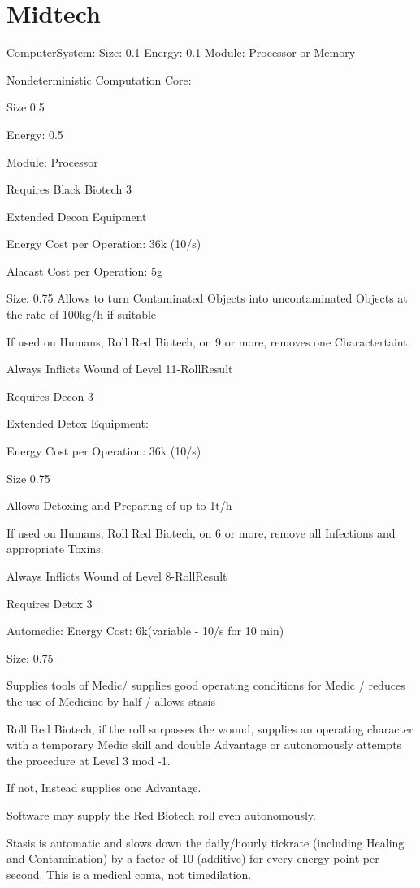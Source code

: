 \section{Midtech}\label{sec:midtech}
ComputerSystem:
Size: 0.1
Energy: 0.1
Module: Processor or Memory\par
\par
Nondeterministic Computation Core:\par
Size 0.5\par
Energy: 0.5\par
Module: Processor\par
Requires Black Biotech 3\par
\par
Extended Decon Equipment\par
Energy Cost per Operation: 36k (10/s)\par
Alacast Cost per Operation: 5g\par
Size: 0.75
Allows to turn Contaminated Objects into uncontaminated Objects at the rate of 100kg/h if suitable\par
If used on Humans, Roll Red Biotech, on 9 or more, removes one Charactertaint.\par
Always Inflicts Wound of Level 11-RollResult\par
Requires Decon 3\par
\par
Extended Detox Equipment:\par
Energy Cost per Operation: 36k (10/s)\par
Size 0.75\par
Allows Detoxing and Preparing of up to 1t/h\par
If used on Humans, Roll Red Biotech, on 6 or more, remove all Infections and appropriate Toxins.\par
Always Inflicts Wound of Level 8-RollResult\par
Requires Detox 3\par
Automedic:
Energy Cost: 6k(variable - 10/s for 10 min)\par
Size: 0.75\par
Supplies tools of Medic/ supplies good operating conditions for Medic / reduces the use of Medicine by half / allows stasis\par
Roll Red Biotech, if the roll surpasses the wound, supplies an operating character with a temporary Medic skill and
double Advantage or autonomously attempts the procedure at Level 3 mod -1.\par
If not, Instead supplies one Advantage.\par
Software may supply the Red Biotech roll even autonomously.\par
Stasis is automatic and slows down the daily/hourly tickrate (including Healing and Contamination) by a factor of 10
(additive) for every energy point per second.
This is a medical coma, not timedilation.
